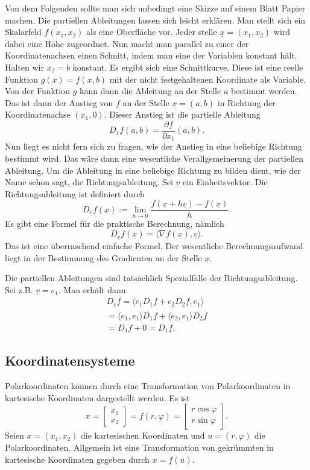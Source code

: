 \documentclass[a4paper,10pt,fleqn,twocolumn,twoside]{article}
\begin{document}
Von dem Folgenden sollte man sich unbedingt eine Skizze auf einem
Blatt Papier machen. Die partiellen Ableitungen lassen sich leicht
erklären. Man stellt sich ein Skalarfeld $f(x_1,x_2)$ als eine
Oberfläche vor. Jeder stelle $\underline x=(x_1,x_2)$ wird dabei
eine Höhe zugeordnet. Nun macht man parallel zu einer der
Koordinatenachsen einen Schnitt, indem man eine der Variablen
konstant hält. Halten wir $x_2=b$ konstant. Es ergibt sich
eine Schnittkurve. Diese ist eine reelle Funktion $g(x)=f(x,b)$
mit der nicht festgehaltenen Koordinate als Variable.
Von der Funktion $g$ kann dann die Ableitung an der Stelle $a$
bestimmt werden. Das ist dann der Anstieg von $f$ an der Stelle
$\underline x=(a,b)$ in Richtung der Koordinatenachse $(x_1,0)$.
Dieser Anstieg ist die partielle Ableitung
\[D_1 f(a,b) = \frac{\partial f}{\partial x_1}(a,b).\]
%
Nun liegt es nicht fern sich zu fragen, wie der Anstieg in eine
beliebige Richtung bestimmt wird. Das wäre dann eine wesentliche
Verallgemeinerung der partiellen Ableitung.
%
Um die Ableitung in eine beliebige Richtung zu bilden dient, wie der
Name schon sagt, die Richtungsableitung. Sei $\underline v$
ein Einheitsvektor. Die Richtungsableitung ist definiert durch
\[D_{\underline v} f(\underline x) := \lim_{h\rightarrow 0}
\frac{f(\underline x+h\underline v)-f(\underline x)}{h}.\]
Es gibt eine Formel für die praktische Berechnung, nämlich
\[D_{\underline v} f(\underline x)
= \langle\nabla f(\underline x),\underline v\rangle.\]
Das ist eine überraschend einfache Formel. Der wesentliche
Berechnungsaufwand liegt in der Bestimmung des Gradienten
an der Stelle $\underline x$.

Die partiellen Ableitungen sind tatsächlich Spezialfälle der
Richtungsableitung. Sei z.B. $\underline v=e_1$. Man erhält dann
\begin{gather*}
D_{\underline v} f
= \langle e_1 D_1f+e_2 D_2 f, e_1\rangle\\
= \langle e_1, e_1\rangle D_1f  + \langle e_2, e_1\rangle D_2 f\\
= D_1f+0 = D_1f.
\end{gather*}

\subsection{Koordinatensysteme}

Polarkoordinaten können durch eine Transformation von
Polarkoordinaten in kartesische Koordinaten dargestellt werden.
Es ist
\[x = \begin{bmatrix}
x_1\\ x_2 \end{bmatrix}
= f(r,\varphi) = \begin{bmatrix}
r\cos\varphi\\
r\sin\varphi
\end{bmatrix}.\]
Seien $x=(x_1,x_2)$ die kartesischen Koordinaten und
$u=(r,\varphi)$ die Polarkoordinaten. Allgemein ist eine
Transformation von gekrümmten in kartesische Koordinaten gegeben durch
$x=f(u).$
\end{document}
